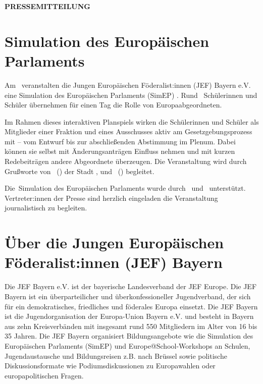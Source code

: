 \documentclass[11pt]{article}
\begin{document}
\thispagestyle{empty}

\begin{center}
    \textbf{\Large PRESSEMITTEILUNG}
\end{center}

\vspace{0.5cm}

\section*{Simulation des Europäischen Parlaments \location}

Am \datum\ veranstalten die Jungen Europäischen Föderalist:innen (JEF) Bayern e.V. eine Simulation des Europäischen Parlaments (SimEP) \location. Rund \numSuS\ Schülerinnen und Schüler übernehmen für einen Tag die Rolle von Europaabgeordneten.

Im Rahmen dieses interaktiven Planspiels wirken die Schülerinnen und Schüler als Mitglieder einer Fraktion und eines Ausschusses aktiv am Gesetzgebungsprozess mit -- vom Entwurf bis zur abschließenden Abstimmung im Plenum. Dabei können sie selbst mit Änderungsanträgen Einfluss nehmen und mit kurzen Redebeiträgen andere Abgeordnete überzeugen. Die Veranstaltung wird durch Grußworte von \stadtvertreter\ (\stadtvertreterOffice) der Stadt \city, und \politiker\ (\politikerOffice) begleitet.

Die~Simulation des Europäischen Parlaments wurde durch \sponsor\ und \localSupport\ unterstützt. Vertreter:innen der Presse sind herzlich eingeladen die Veranstaltung journalistisch zu begleiten.

\section*{Über die Jungen Europäischen Föderalist:innen (JEF) Bayern}

Die JEF Bayern e.V. ist der bayerische Landesverband der JEF Europe. Die JEF Bayern ist ein überparteilicher und überkonfessioneller Jugendverband, der sich für ein demokratisches, friedliches und föderales Europa einsetzt. Die JEF Bayern ist die Jugendorganisation der Europa-Union Bayern e.V. und besteht in Bayern aus zehn Kreisverbänden mit insgesamt rund 550 Mitgliedern im Alter von 16 bis 35 Jahren. Die JEF Bayern organisiert Bildungsangebote wie die Simulation des Europäischen Parlaments (SimEP) und Europe@School-Workshops an Schulen, Jugendaustausche und Bildungsreisen z.B. nach Brüssel sowie politische Diskussionsformate wie Podiumsdiskussionen zu Europawahlen oder europapolitischen Fragen.
\end{document}
